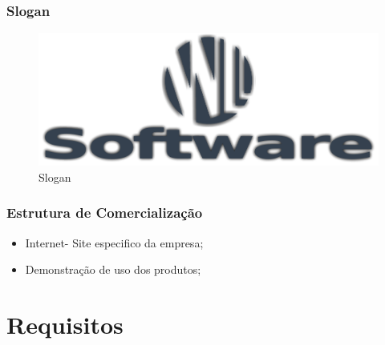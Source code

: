 \documentclass[chapter=TITLE,12pt,oneside,a4paper,english,french,sumario=tradicional,spanish,brazil,]{abntex2}
\begin{document}
\subsection{Slogan}
\begin{figure}[!htpb]\centering
	\includegraphics[scale=0.8]{logo.pdf}\caption{Slogan}
\end{figure}


\subsection{Estrutura de Comercialização}
\begin{itemize}
\item Internet- Site especifico da empresa;
\item Demonstração de uso dos produtos;
\end{itemize}


\chapter{Requisitos}
\vspace{-0.6cm}
\end{document}
